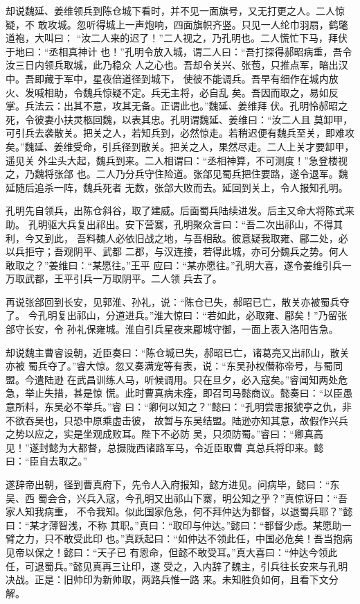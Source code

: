 却说魏延、姜维领兵到陈仓城下看时，并不见一面旗号，又无打更之人。二人惊疑，不
敢攻城。忽听得城上一声炮响，四面旗帜齐竖。只见一人纶巾羽扇，鹤氅道袍，大叫曰：
“汝二人来的迟了！”二人视之，乃孔明也。二人慌忙下马，拜伏于地曰：“丞相真神计
也！”孔明令放入城，谓二人曰：“吾打探得郝昭病重，吾令汝三日内领兵取城，此乃稳众
人之心也。吾却令关兴、张苞，只推点军，暗出汉中。吾即藏于军中，星夜倍道径到城下，
使彼不能调兵。吾早有细作在城内放火、发喊相助，令魏兵惊疑不定。兵无主将，必自乱
矣。吾因而取之，易如反掌。兵法云：出其不意，攻其无备。正谓此也。”魏延、姜维拜
伏。孔明怜郝昭之死，令彼妻小扶灵柩回魏，以表其忠。孔明谓魏延、姜维曰：“汝二人且
莫卸甲，可引兵去袭散关。把关之人，若知兵到，必然惊走。若稍迟便有魏兵至关，即难攻
矣。”魏延、姜维受命，引兵径到散关。把关之人，果然尽走。二人上关才要卸甲，遥见关
外尘头大起，魏兵到来。二人相谓曰：“丞相神算，不可测度！”急登楼视之，乃魏将张郃
也。二人乃分兵守住险道。张郃见蜀兵把住要路，遂令退军。魏延随后追杀一阵，魏兵死者
无数，张郃大败而去。延回到关上，令人报知孔明。

孔明先自领兵，出陈仓斜谷，取了建威。后面蜀兵陆续进发。后主又命大将陈式来助。
孔明驱大兵复出祁出。安下营寨，孔明聚众言曰：“吾二次出祁山，不得其利，今又到此，
吾料魏人必依旧战之地，与吾相敌。彼意疑我取雍、郿二处，必以兵拒守；吾观阴平、武都
二郡，与汉连接，若得此城，亦可分魏兵之势。何人敢取之？”姜维曰：“某愿往。”王平
应曰：“某亦愿往。”孔明大喜，遂令姜维引兵一万取武都，王平引兵一万取阴平。二人领
兵去了。

再说张郃回到长安，见郭淮、孙礼，说：“陈仓已失，郝昭已亡，散关亦被蜀兵夺了。
今孔明复出祁山，分道进兵。”淮大惊曰：“若如此，必取雍、郿矣！”乃留张郃守长安，令
孙礼保雍城。淮自引兵星夜来郿城守御，一面上表入洛阳告急。

却说魏主曹睿设朝，近臣奏曰：“陈仓城已失，郝昭已亡，诸葛亮又出祁山，散关亦被
蜀兵夺了。”睿大惊。忽又奏满宠等有表，说：“东吴孙权僭称帝号，与蜀同盟。今遣陆逊
在武昌训练人马，听候调用。只在旦夕，必入寇矣。”睿闻知两处危急，举止失措，甚是惊
慌。此时曹真病未痊，即召司马懿商议。懿奏曰：“以臣愚意所料，东吴必不举兵。”睿
曰：“卿何以知之？”懿曰：“孔明尝思报猇亭之仇，非不欲吞吴也，只恐中原乘虚击彼，
故暂与东吴结盟。陆逊亦知其意，故假作兴兵之势以应之，实是坐观成败耳。陛下不必防
吴，只须防蜀。”睿曰：“卿真高见！”遂封懿为大都督，总摄陇西诸路军马，令近臣取曹
真总兵将印来。懿曰：“臣自去取之。”

遂辞帝出朝，径到曹真府下，先令人入府报知，懿方进见。问病毕，懿曰：“东吴、西
蜀会合，兴兵入寇，今孔明又出祁山下寨，明公知之乎？”真惊讶曰：“吾家人知我病重，
不令我知。似此国家危急，何不拜仲达为都督，以退蜀兵耶？”懿曰：“某才薄智浅，不称
其职。”真曰：“取印与仲达。”懿曰：“都督少虑。某愿助一臂之力，只不敢受此印
也。”真跃起曰：“如仲达不领此任，中国必危矣！吾当抱病见帝以保之！懿曰：“天子已
有恩命，但懿不敢受耳。”真大喜曰：“仲达今领此任，可退蜀兵。”懿见真再三让印，遂
受之，入内辞了魏主，引兵往长安来与孔明决战。正是：旧帅印为新帅取，两路兵惟一路
来。未知胜负如何，且看下文分解。